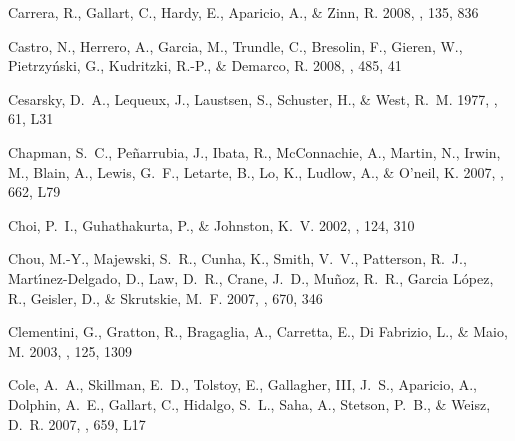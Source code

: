 \documentclass[manuscript]{aastex}
\begin{document}
\begin{thebibliography}{381}
{Carrera}, R., {Gallart}, C., {Hardy}, E., {Aparicio}, A., \& {Zinn}, R. 2008,
  \aj, 135, 836

{Castro}, N., {Herrero}, A., {Garcia}, M., {Trundle}, C., {Bresolin}, F.,
  {Gieren}, W., {Pietrzy{\'n}ski}, G., {Kudritzki}, R.-P., \& {Demarco}, R.
  2008, \aap, 485, 41

{Cesarsky}, D.~A., {Lequeux}, J., {Laustsen}, S., {Schuster}, H., \& {West},
  R.~M. 1977, \aap, 61, L31

{Chapman}, S.~C., {Pe{\~n}arrubia}, J., {Ibata}, R., {McConnachie}, A.,
  {Martin}, N., {Irwin}, M., {Blain}, A., {Lewis}, G.~F., {Letarte}, B., {Lo},
  K., {Ludlow}, A., \& {O'neil}, K. 2007, \apjl, 662, L79

{Choi}, P.~I., {Guhathakurta}, P., \& {Johnston}, K.~V. 2002, \aj, 124, 310

{Chou}, M.-Y., {Majewski}, S.~R., {Cunha}, K., {Smith}, V.~V., {Patterson},
  R.~J., {Mart{\'{\i}}nez-Delgado}, D., {Law}, D.~R., {Crane}, J.~D.,
  {Mu{\~n}oz}, R.~R., {Garcia L{\'o}pez}, R., {Geisler}, D., \& {Skrutskie},
  M.~F. 2007, \apj, 670, 346

{Clementini}, G., {Gratton}, R., {Bragaglia}, A., {Carretta}, E., {Di
  Fabrizio}, L., \& {Maio}, M. 2003, \aj, 125, 1309

{Cole}, A.~A., {Skillman}, E.~D., {Tolstoy}, E., {Gallagher}, III, J.~S.,
  {Aparicio}, A., {Dolphin}, A.~E., {Gallart}, C., {Hidalgo}, S.~L., {Saha},
  A., {Stetson}, P.~B., \& {Weisz}, D.~R. 2007, \apjl, 659, L17


\end{thebibliography}
\end{document}
